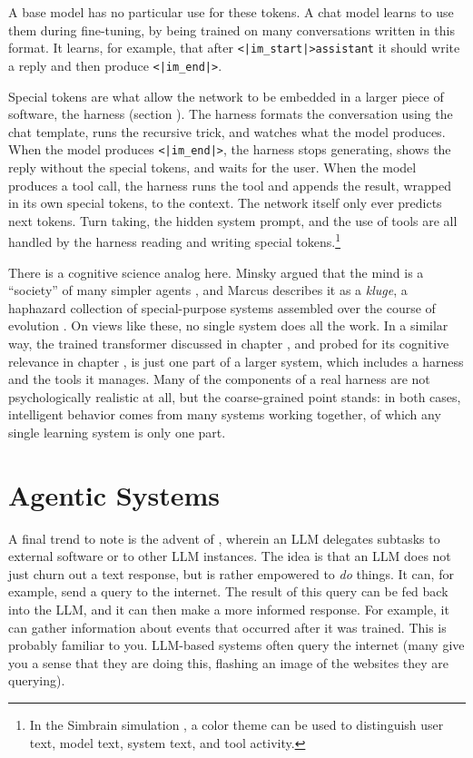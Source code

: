 A base model has no particular use for these tokens. A chat model learns to use
them during fine-tuning, by being trained on many conversations written in this
format. It learns, for example, that after \texttt{<|im\_start|>assistant} it
should write a reply and then produce \texttt{<|im\_end|>}.

Special tokens are what allow the network to be embedded in a larger piece of
software, the harness (section ). The harness formats the conversation
using the chat template, runs the recursive trick, and watches what the model
produces. When the model produces \texttt{<|im\_end|>}, the harness stops
generating, shows the reply without the special tokens, and waits for the user.
When the model produces a tool call, the harness runs the tool and appends the
result, wrapped in its own special tokens, to the context. The network itself
only ever predicts next tokens. Turn taking, the hidden system prompt, and the
use of tools are all handled by the harness reading and writing special
tokens.\footnote{In the Simbrain simulation
, a color theme can be used to
distinguish user text, model text, system text, and tool activity.}

There is a cognitive science analog here. Minsky argued that the mind is a
``society'' of many simpler agents \cite{minsky1986society}, and Marcus
describes it as a \emph{kluge}, a haphazard collection of special-purpose
systems assembled over the course of evolution \cite{marcus2008kluge}. On
views like these, no single system does all the work. In a similar way, the
trained transformer discussed in chapter , and probed
for its cognitive relevance in chapter , is just one part
of a larger system, which includes a harness and the tools it manages. Many of
the components of a real harness are not psychologically realistic at all, but
the coarse-grained point stands: in both cases, intelligent behavior comes from
many systems working together, of which any single learning system is only one
part.

\section{Agentic Systems}


A final trend to note is the advent of , wherein an
LLM delegates subtasks to external software or to other LLM instances. The idea
is that an LLM does not just churn out a text response, but is rather empowered
to \emph{do} things. It can, for example, send a query to the
internet. The result of this query can be fed back into the LLM, and it
can then make a more informed response. For example, it can gather information about events that occurred after it was trained. This is probably familiar to you. LLM-based systems
often query the internet (many give you a sense that they are doing
this, flashing an image of the websites they are querying).

